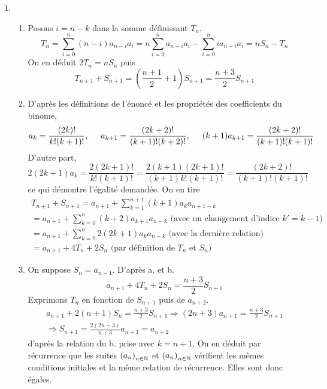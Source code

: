 \begin{enumerate}
\begin{enumerate}
\end{enumerate}

 \item 
\begin{enumerate}
 \item Posons $i=n-k$ dans la somme définissant $T_n$.
\begin{displaymath}
 T_n = \sum_{i=0}^n (n-i)a_{n-i}a_i= n\sum_{i=0}^n a_{n-i}a_i - \sum_{i=0}^n ia_{n-i}a_i
= nS_n - T_n
\end{displaymath}
 On en déduit $2T_n = nS_n$ puis
\begin{displaymath}
 T_{n+1}+S_{n+1} = \left( \frac{n+1}{2}+1\right) S_{n+1}=\frac{n+3}{2}S_{n+1}
\end{displaymath}

 \item D'après les définitions de l'énoncé et les propriétés des coefficients du binome,
\begin{displaymath}
 a_k=\frac{(2k)!}{k!(k+1)!},\hspace{0.5cm}
 a_{k+1}=\frac{(2k+2)!}{(k+1)!(k+2)!},\hspace{0.5cm}
 (k+1)a_{k+1}=\frac{(2k+2)!}{(k+1)!(k+1)!}
\end{displaymath}
D'autre part,
\begin{displaymath}
 2(2k+1)a_k=\frac{2(2k+1)!}{k!(k+1)!} = \frac{2(k+1)(2k+1)!}{(k+1)k!(k+1)!}=\frac{(2k+2)!}{(k+1)!(k+1)!}
\end{displaymath}
ce qui démontre l'égalité demandée. On en tire
\begin{multline*}
 T_{n+1}+S_{n+1}=a_{n+1}+\sum_{k=1}^{n+1}(k+1)a_ka_{n+1-k}\\
= a_{n+1}+\sum_{k=0}^{n}(k+2)a_{k+1}a_{n-k} \text{ (avec un changement d'indice  $k'=k-1$)}\\
= a_{n+1}+\sum_{k=0}^{n}2(2k+1)a_{k}a_{n-k} \text{ (avec la dernière relation) }\\
= a_{n+1} + 4T_n +2S_n \text{ (par définition de $T_n$ et $S_n$)}
\end{multline*}

 \item On suppose $S_n = a_{n+1}$. D'après a. et b.
\begin{displaymath}
 a_{n+1}+4T_n+2S_n = \frac{n+3}{2}S_{n+1}
\end{displaymath}
Exprimons $T_n$ en fonction de $S_{n+1}$ puis de $a_{n+2}$.
\begin{multline*}
 a_{n+1}+2(n+1)S_n= \frac{n+3}{2}S_{n+1} \Rightarrow
(2n+3)a_{n+1} = \frac{n+3}{2}S_{n+1}\\
\Rightarrow 
S_{n+1} = \frac{2(2n+3)}{n+3}a_{n+1} = a_{n+2}
\end{multline*}
d'après la relation du b. prise avec $k=n+1$.
On en déduit par récurrence que les suites $\left( a_n\right) _{n\in \mathbb{N}}$ et $\left( a_n\right) _{n\in \mathbb{N}}$ vérifient les mêmes conditions initiales et la même relation de récurrence. Elles sont donc égales.
\end{enumerate}

\end{enumerate}
